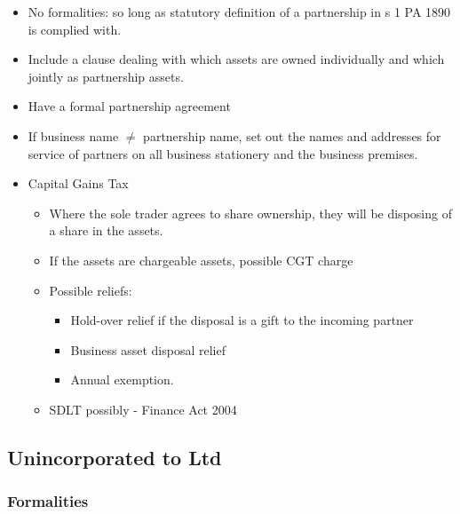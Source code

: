 \documentclass[
]{article}
\providecommand{\tightlist}{%
  \setlength{\itemsep}{0pt}\setlength{\parskip}{0pt}}
\begin{document}
\begin{itemize}
\tightlist
\item
  No formalities: so long as statutory definition of a partnership in s
  1 PA 1890 is complied with.
\item
  Include a clause dealing with which assets are owned individually and
  which jointly as partnership assets.
\item
  Have a formal partnership agreement
\item
  If business name {\(\neq\)} partnership name, set out the names and
  addresses for service of partners on all business stationery and the
  business premises.
\item
  Capital Gains Tax

  \begin{itemize}
  \tightlist
  \item
    Where the sole trader agrees to share ownership, they will be
    disposing of a share in the assets.
  \item
    If the assets are chargeable assets, possible CGT charge
  \item
    Possible reliefs:

    \begin{itemize}
    \tightlist
    \item
      Hold-over relief if the disposal is a gift to the incoming partner
    \item
      Business asset disposal relief
    \item
      Annual exemption.
    \end{itemize}
  \item
    SDLT possibly - Finance Act 2004
  \end{itemize}
\end{itemize}

\hypertarget{unincorporated-to-ltd}{%
\subsection{Unincorporated to Ltd}\label{unincorporated-to-ltd}}

\hypertarget{formalities}{%
\subsubsection{Formalities}\label{formalities}}
\end{document}
